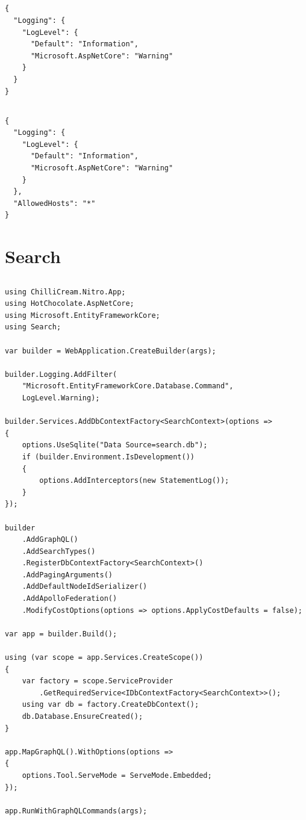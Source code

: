 \subsection*{}
\begin{verbatim}
{
  "Logging": {
    "LogLevel": {
      "Default": "Information",
      "Microsoft.AspNetCore": "Warning"
    }
  }
}
\end{verbatim}

\subsection*{}
\begin{verbatim}
{
  "Logging": {
    "LogLevel": {
      "Default": "Information",
      "Microsoft.AspNetCore": "Warning"
    }
  },
  "AllowedHosts": "*"
}
\end{verbatim}
\section{Search}

\subsection*{}
\begin{verbatim}
using ChilliCream.Nitro.App;
using HotChocolate.AspNetCore;
using Microsoft.EntityFrameworkCore;
using Search;

var builder = WebApplication.CreateBuilder(args);

builder.Logging.AddFilter(
    "Microsoft.EntityFrameworkCore.Database.Command",
    LogLevel.Warning);

builder.Services.AddDbContextFactory<SearchContext>(options =>
{
    options.UseSqlite("Data Source=search.db");
    if (builder.Environment.IsDevelopment())
    {
        options.AddInterceptors(new StatementLog());
    }
});

builder
    .AddGraphQL()
    .AddSearchTypes()
    .RegisterDbContextFactory<SearchContext>()
    .AddPagingArguments()
    .AddDefaultNodeIdSerializer()
    .AddApolloFederation()
    .ModifyCostOptions(options => options.ApplyCostDefaults = false);

var app = builder.Build();

using (var scope = app.Services.CreateScope())
{
    var factory = scope.ServiceProvider
        .GetRequiredService<IDbContextFactory<SearchContext>>();
    using var db = factory.CreateDbContext();
    db.Database.EnsureCreated();
}

app.MapGraphQL().WithOptions(options =>
{
    options.Tool.ServeMode = ServeMode.Embedded;
});

app.RunWithGraphQLCommands(args);
\end{verbatim}


